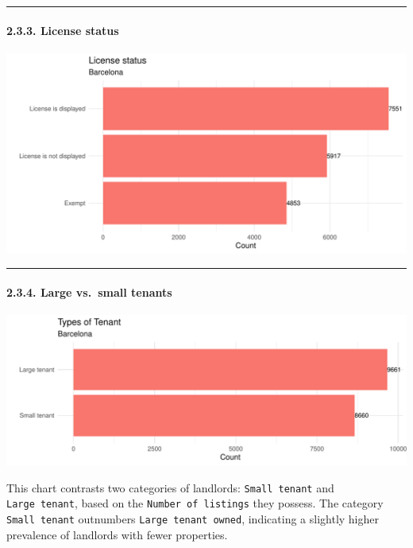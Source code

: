 \documentclass[
]{article}
\begin{document}
\begin{center}\rule{0.5\linewidth}{0.5pt}\end{center}

\hypertarget{license-status-1}{%
\paragraph{2.3.3. License status}\label{license-status-1}}

\begin{center}\includegraphics{Barcelona-AirBnB-Insights_files/figure-latex/plot3-1} \end{center}

\begin{center}\rule{0.5\linewidth}{0.5pt}\end{center}

\hypertarget{large-vs.-small-tenants}{%
\paragraph{2.3.4. Large vs.~small
tenants}\label{large-vs.-small-tenants}}

\begin{center}\includegraphics{Barcelona-AirBnB-Insights_files/figure-latex/plot4-1} \end{center}

This chart contrasts two categories of landlords: \texttt{Small\ tenant}
and \texttt{Large\ tenant}, based on the \texttt{Number\ of\ listings}
they possess. The category \texttt{Small\ tenant} outnumbers
\texttt{Large\ tenant\ owned}, indicating a slightly higher prevalence
of landlords with fewer properties.
\end{document}
